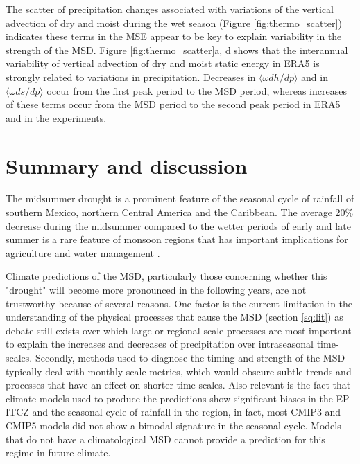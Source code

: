 The scatter of precipitation changes associated with variations of the vertical advection of dry and moist during the wet season (Figure \ref{fig:thermo_scatter}) indicates these terms in the MSE appear to be key to explain variability in the strength of the MSD. Figure \ref{fig:thermo_scatter}a, d shows that the interannual variability of vertical advection of dry and moist static energy in ERA5 is strongly related to variations in precipitation. Decreases in $\langle \omega dh/dp \rangle$ and in $\langle \omega ds/dp \rangle$ occur from the first peak period to the MSD period, whereas increases of these terms occur from the MSD period to the second peak period in ERA5 and in the experiments. 




\section{Summary and discussion}\label{sq:sumdiscuss}



The midsummer drought  is a  prominent feature of the seasonal cycle of rainfall of southern Mexico, northern Central America and the Caribbean. The average 20\%  decrease during the midsummer compared to the wetter periods of early and late summer is a rare feature of monsoon regions that has important implications for agriculture and water management  \citep{hellin2017,de2018,harvey2018}. 

Climate predictions of the MSD, particularly those concerning whether this "drought" will become more pronounced in the following years, are not trustworthy because of several reasons. 
One factor is the current limitation in the understanding of the physical processes that cause the MSD (section \ref{sq:lit}) as debate still exists over which large or regional-scale processes are most important to explain the increases and decreases of precipitation over intraseasonal time-scales.
Secondly, methods used to diagnose the timing and strength of the MSD typically deal with monthly-scale metrics, which would obscure subtle trends and processes that have an effect on shorter time-scales. 
Also relevant is the fact that climate models used to produce the predictions show significant biases in the EP ITCZ and the seasonal cycle of rainfall in the region, in fact, most CMIP3 and CMIP5 models did not show a bimodal signature in the seasonal cycle. Models that do not have a climatological MSD cannot provide a prediction for this regime in future climate. 

